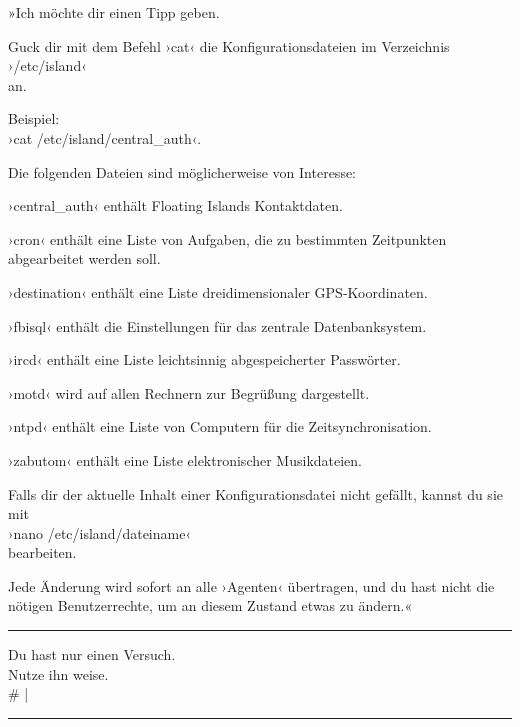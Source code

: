 »Ich möchte dir einen Tipp geben.

Guck dir mit dem Befehl ›cat‹ die Konfigurationsdateien im Verzeichnis\\
›/etc/island‹\\
an.

Beispiel:\\
›cat /etc/island/central\_auth‹.

Die folgenden Dateien sind möglicherweise von Interesse:

›central\_auth‹ enthält Floating Islands Kontaktdaten.

›cron‹ enthält eine Liste von Aufgaben, die zu bestimmten Zeitpunkten abgearbeitet werden soll.

›destination‹ enthält eine Liste dreidimensionaler GPS-Koordinaten.

›fbisql‹ enthält die Einstellungen für das zentrale Datenbanksystem.

›ircd‹ enthält eine Liste leichtsinnig abgespeicherter Passwörter.

›motd‹ wird auf allen Rechnern zur Begrüßung dargestellt.

›ntpd‹ enthält eine Liste von Computern für die Zeitsynchronisation.

›zabutom‹ enthält eine Liste elektronischer Musikdateien.

Falls dir der aktuelle Inhalt einer Konfigurationsdatei nicht gefällt, kannst du sie mit\\
›nano /etc/island/dateiname‹\\
bearbeiten.

Jede Änderung wird sofort an alle ›Agenten‹ übertragen, und du hast nicht die nötigen Benutzerrechte, um an diesem Zustand etwas zu ändern.«

\noindent \parbox{\textwidth}{ \vspace{3ex} \hrule \vspace{3ex}

    \begin{tiny}
    \begin{ttfamily}

\noindent Du hast nur einen Versuch.\\
\noindent Nutze ihn weise.\\
\noindent \# |

    \end{ttfamily}
    \end{tiny}

\vspace{3ex} \hrule \vspace{3ex} }

